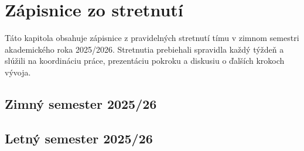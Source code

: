 











\section{Zápisnice zo stretnutí}

Táto kapitola obsahuje zápisnice z pravidelných stretnutí tímu v zimnom semestri akademického roka 2025/2026. Stretnutia prebiehali spravidla každý týždeň a slúžili na koordináciu práce, prezentáciu pokroku a diskusiu o ďalších krokoch vývoja.

\subsection{Zimný semester 2025/26}








\subsection{Letný semester 2025/26}

%
% 
% 
% 
% 
% 
